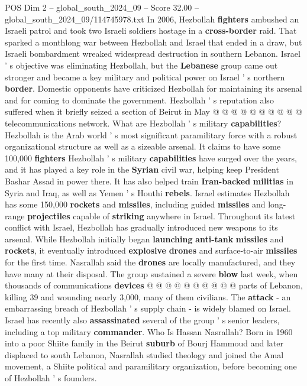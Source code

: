 \begin{textsample}{POS Dim 2 – global\_south\_2024\_09 – Score 32.00 – global\_south\_2024\_09/114745978.txt}
In 2006, Hezbollah \textbf{fighters} ambushed an Israeli patrol and took two Israeli soldiers hostage in a \textbf{cross-border} raid.
That sparked a monthlong war between Hezbollah and Israel that ended in a draw, but Israeli bombardment wreaked widespread destruction in southern Lebanon.
Israel ' s objective was eliminating Hezbollah, but the \textbf{Lebanese} group came out stronger and became a key military and political power on Israel ' s northern \textbf{border}.
Domestic opponents have criticized Hezbollah for maintaining its arsenal and for coming to dominate the government.
Hezbollah ' s reputation also suffered when it briefly seized a section of Beirut in May @ @ @ @ @ @ @ @ @ @ telecommunications network.
What are Hezbollah ' s military \textbf{capabilities}?
Hezbollah is the Arab world ' s most significant paramilitary force with a robust organizational structure as well as a sizeable arsenal.
It claims to have some 100,000 \textbf{fighters} Hezbollah ' s military \textbf{capabilities} have surged over the years, and it has played a key role in the \textbf{Syrian} civil war, helping keep President Bashar Assad in power there.
It has also helped train \textbf{Iran-backed} \textbf{militias} in Syria and Iraq, as well as Yemen ' s Houthi \textbf{rebels}.
Israel estimates Hezbollah has some 150,000 \textbf{rockets} and \textbf{missiles}, including guided \textbf{missiles} and long-range \textbf{projectiles} capable of \textbf{striking} anywhere in Israel.
Throughout its latest conflict with Israel, Hezbollah has gradually introduced new weapons to its arsenal.
While Hezbollah initially began \textbf{launching} \textbf{anti-tank} \textbf{missiles} and \textbf{rockets}, it eventually introduced \textbf{explosive} \textbf{drones} and surface-to-air \textbf{missiles} for the first time.
Nasrallah said the \textbf{drones} are locally manufactured, and they have many at their disposal.
The group sustained a severe \textbf{blow} last week, when thousands of communications \textbf{devices} @ @ @ @ @ @ @ @ @ @ parts of Lebanon, killing 39 and wounding nearly 3,000, many of them civilians.
The \textbf{attack} - an embarrassing breach of Hezbollah ' s supply chain - is widely blamed on Israel.
Israel has recently also \textbf{assassinated} several of the group ' s senior leaders, including a top military \textbf{commander}.
Who Is Hassan Nasrallah?
Born in 1960 into a poor Shiite family in the Beirut \textbf{suburb} of Bourj Hammoud and later displaced to south Lebanon, Nasrallah studied theology and joined the Amal movement, a Shiite political and paramilitary organization, before becoming one of Hezbollah ' s founders.

\end{textsample}

